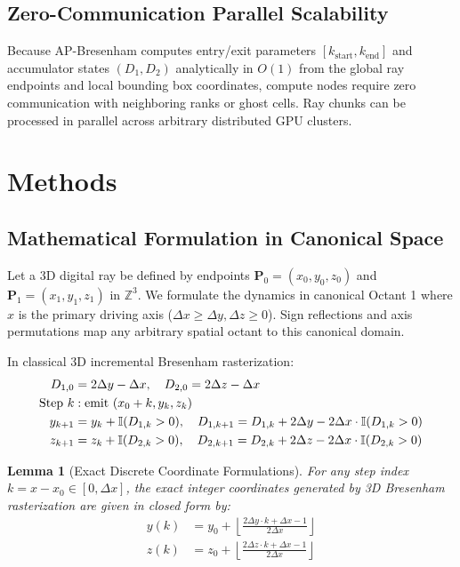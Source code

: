\documentclass[journal=dme,manuscript=article,11pt]{article}
\newtheorem{lemma}{Lemma}
\begin{document}
\subsection{Zero-Communication Parallel Scalability}
Because AP-Bresenham computes entry/exit parameters $[k_{\mathrm{start}}, k_{\mathrm{end}}]$ and accumulator states $(D_1, D_2)$ analytically in $O(1)$ from the global ray endpoints and local bounding box coordinates, compute nodes require zero communication with neighboring ranks or ghost cells. Ray chunks can be processed in parallel across arbitrary distributed GPU clusters.\cite{kim2024heterogeneous,wang2025distributed,liu2026ultra}

\section{Methods}
\label{sec:methods}

\subsection{Mathematical Formulation in Canonical Space}
Let a 3D digital ray be defined by endpoints $\mathbf{P}_0 = (x_0, y_0, z_0)$ and $\mathbf{P}_1 = (x_1, y_1, z_1)$ in $\mathbb{Z}^3$. We formulate the dynamics in canonical Octant 1 where $x$ is the primary driving axis ($\Delta x \ge \Delta y, \Delta z \ge 0$). Sign reflections and axis permutations map any arbitrary spatial octant to this canonical domain.

In classical 3D incremental Bresenham rasterization:\cite{bresenham1965algorithm}
\begin{align}
    D_{1,0} &= 2\Delta y - \Delta x, \quad D_{2,0} = 2\Delta z - \Delta x \\
    \text{Step } k &: \text{emit } (x_0 + k, y_k, z_k) \notag \\
    y_{k+1} &= y_k + \mathbb{I}(D_{1,k} > 0), \quad D_{1,k+1} = D_{1,k} + 2\Delta y - 2\Delta x \cdot \mathbb{I}(D_{1,k} > 0) \notag \\
    z_{k+1} &= z_k + \mathbb{I}(D_{2,k} > 0), \quad D_{2,k+1} = D_{2,k} + 2\Delta z - 2\Delta x \cdot \mathbb{I}(D_{2,k} > 0) \notag
\end{align}

\begin{lemma}[Exact Discrete Coordinate Formulations]
\label{lem:pixel_coord}
For any step index $k = x - x_0 \in [0, \Delta x]$, the exact integer coordinates generated by 3D Bresenham rasterization are given in closed form by:
\begin{align}
    y(k) &= y_0 + \left\lfloor \frac{2\Delta y \cdot k + \Delta x - 1}{2\Delta x} \right\rfloor \label{eq:y_closed_form} \\
    z(k) &= z_0 + \left\lfloor \frac{2\Delta z \cdot k + \Delta x - 1}{2\Delta x} \right\rfloor \label{eq:z_closed_form}
\end{align}
\end{lemma}
\end{document}
